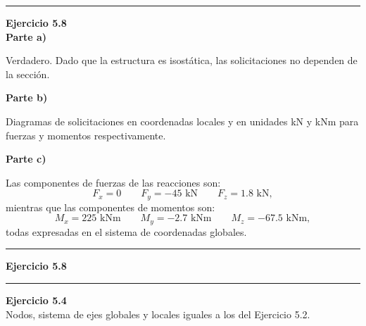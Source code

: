 \hrule
\vspace{5mm}
\textbf{Ejercicio 5.8}\\



\textbf{Parte a)}

Verdadero. Dado que la estructura es isostática, las solicitaciones no dependen de la  sección.

\vspace{5mm}

\textbf{Parte b)}

Diagramas de solicitaciones en coordenadas locales y en unidades kN y kNm para fuerzas y momentos respectivamente.


\begin{center}
	\def\svgwidth{0.65\textwidth}
	
\end{center}

\vspace{5mm}

\textbf{Parte c)}

Las componentes de fuerzas de las reacciones son:
$$
F_x = 0 \qquad F_y = -45 \text{ kN} \qquad F_z = 1.8 \text{ kN},
$$
%
mientras que las componentes de momentos son:
$$
M_x = 225  \text{ kNm} \qquad M_y = -2.7 \text{ kNm} \qquad M_z = -67.5 \text{ kNm},
$$
%
todas expresadas en el sistema de coordenadas globales.





\hrule
\vspace{5mm}
\textbf{Ejercicio 5.8}\\

\begin{center}
	\def\svgwidth{0.8\textwidth}
	
\end{center}










\hrule 
\vspace{5mm}
\textbf{Ejercicio 5.4}\\

Nodos, sistema de ejes globales y locales iguales a los del Ejercicio 5.2.



